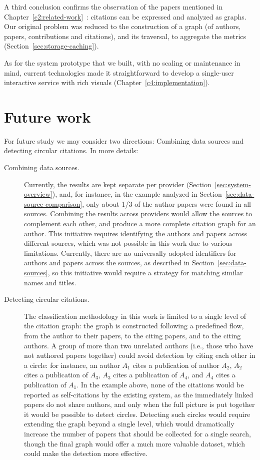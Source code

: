 A third conclusion confirms the observation of the papers mentioned in Chapter~\ref{c2:related-work}~\cite{Boyack2005, Chronis2020, Chronis2021}: citations can be expressed and analyzed as graphs.
Our original problem was reduced to the construction of a graph (of authors, papers, contributions and citations), and its traversal, to aggregate the metrics (Section~\ref{sec:storage-caching}).

As for the system prototype that we built, with no scaling or maintenance in mind, current technologies made it straightforward to develop a single-user interactive service with rich visuals (Chapter~\ref{c4:implementation}).

\section{Future work} \label{sec:future-work}
For future study we may consider two directions: Combining data sources and detecting circular citations. In more details: 
\begin{description}
\item
[Combining data sources.] Currently, the results are kept separate per provider (Section~\ref{sec:system-overview}), and, for instance, in the example analyzed in Section~\ref{sec:data-source-comparison}, only about 1/3 of the author papers were found in all sources.
Combining the results across providers would allow the sources to complement each other, and produce a more complete citation graph for an author.
This initiative requires identifying the authors and papers across different sources, which was not possible in this work due to various limitations.
Currently, there are no universally adopted identifiers for authors and papers across the sources, as described in Section~\ref{sec:data-sources}, so this initiative would require a strategy for matching similar names and titles.
\item
[Detecting circular citations.] The classification methodology in this work is limited to a single level of the citation graph: the graph is constructed following a predefined flow, from the author to their papers, to the citing papers, and to the citing authors.
A group of more than two unrelated authors (i.e., those who have not authored papers together) could avoid detection by citing each other in a circle: for instance, an author $A_1$ cites a publication of author $A_2$, $A_2$ cites a publication of $A_3$, $A_3$ cites a publication of $A_4$, and $A_4$ cites a publication of $A_1$.
In the example above, none of the citations would be reported as self-citations by the existing system, as the immediately linked papers do not share authors, and only when the full picture is put together it would be possible to detect circles.
Detecting such circles would require extending the graph beyond a single level, which would dramatically increase the number of papers that should be collected for a single search, though the final graph would offer a much more valuable dataset, which could make the detection more effective.
\end{description}
